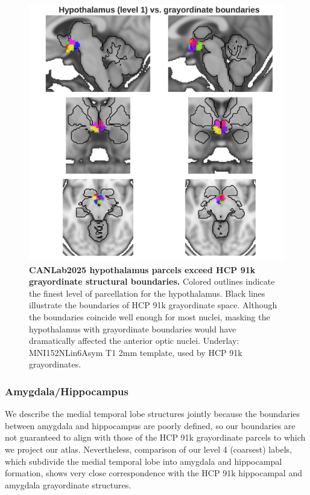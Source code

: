 \documentclass[10pt,letterpaper]{article}
\begin{document}
\begin{figure}[t!]
\centering
\includegraphics[width=\linewidth]{images/hypothal_vs_cifti.png}
\caption{
{\bf
CANLab2025 hypothalamus parcels exceed HCP 91k grayordinate structural boundaries.} 
Colored outlines indicate the finest level of parcellation for the hypothalamus. Black lines illustrate the boundaries of HCP 91k grayordinate space. Although the boundaries coincide well enough for most nuclei, masking the hypothalamus with grayordinate boundaries would have dramatically affected the anterior optic nuclei. Underlay: MNI152NLin6Asym T1 2mm template, used by HCP 91k grayordinates.}
\label{hypothal-vs-cifti-figure}
\end{figure}

\subsubsection{Amygdala/Hippocampus}
We describe the medial temporal lobe structures jointly because the boundaries between amygdala and hippocampus are poorly defined, so our boundaries are not guaranteed to align with those of the HCP 91k grayordinate parcels to which we project our atlas. Nevertheless, comparison of our level 4 (coarsest) labels, which subdivide the medial temporal lobe into amygdala and hippocampal formation, shows very close correspondence with the HCP 91k hippocampal and amygdala grayordinate structures.
\end{document}
